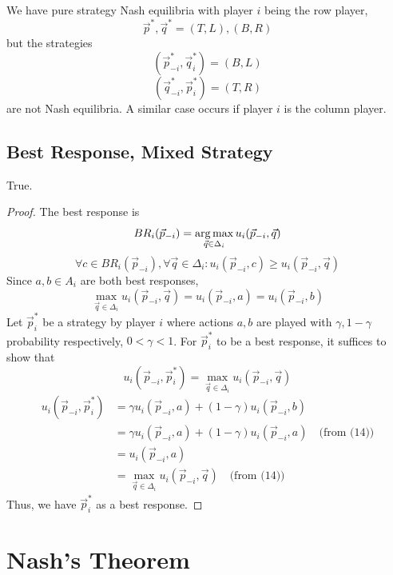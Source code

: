 \noindent We have pure strategy Nash equilibria with player $i$ being the row player, 
\[\vec{p}^*,\vec{q}^*=(T,L),(B,R)\]
but the strategies
\[(\vec{p}_{-i}^*,\vec{q}_i^*)=(B,L)\]
\[(\vec{q}_{-i}^*,\vec{p}_i^*)=(T,R)\]
are not Nash equilibria. 
A similar case occurs if player $i$ is the column player.

\newpage
\subsection{Best Response, Mixed Strategy}
True.\\
\begin{proof}
The best response is
\[BR_i(\vec{p}_{-i})=\operatorname*{arg\,max}_{\vec{q}\in\Delta_i}u_i(\vec{p}_{-i},\vec{q})\]
\begin{equation}
    \forall c\in BR_i(\vec{p}_{-i}),\forall\vec{q}\in\Delta_i: 
    u_i(\vec{p}_{-i},c)\geq u_i(\vec{p}_{-i},\vec{q})
\end{equation}
Since $a,b\in A_i$ are both best responses,
\begin{equation}
    \max_{\vec{q}\in\Delta_i}u_i(\vec{p}_{-i},\vec{q})
    =u_i(\vec{p}_{-i},a)=u_i(\vec{p}_{-i},b)
\end{equation}
Let $\vec{p}_i^*$ be a strategy by player $i$ where
actions $a,b$ are played with $\gamma,1-\gamma$ probability 
respectively, $0<\gamma < 1$. 
For $\vec{p}_i^*$ to be a best response, it suffices to show that 
\[u_i(\vec{p}_{-i},\vec{p}_i^*) 
= \max_{\vec{q}\in\Delta_i}u_i(\vec{p}_{-i},\vec{q})\]
\begin{equation}
\begin{aligned}
    u_i(\vec{p}_{-i},\vec{p}_i^*) 
    &= \gamma u_i(\vec{p}_{-i},a) + (1-\gamma) u_i(\vec{p}_{-i},b)\\
    &= \gamma u_i(\vec{p}_{-i},a) + (1-\gamma) u_i(\vec{p}_{-i},a)
    \quad\text{(from (14))}\\
    &= u_i(\vec{p}_{-i},a)\\
    &= \max_{\vec{q}\in\Delta_i}u_i(\vec{p}_{-i},\vec{q})
    \quad\text{(from (14))}
\end{aligned}
\end{equation}
Thus, we have $\vec{p}_i^*$ as a best response.
\end{proof}

\newpage
\section{Nash's Theorem}

